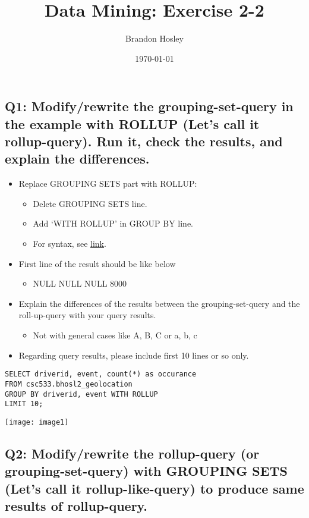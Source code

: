 \documentclass[]{article}
\title{Data Mining: Exercise 2-2}
\author{Brandon Hosley}
\date{\today}
\begin{document}
\maketitle


\subsection*{Q1: Modify/rewrite the grouping-set-query in the example with ROLLUP (Let’s call it rollup-query). Run it, check the results, and explain the differences.}

\begin{itemize}
	\item Replace GROUPING SETS part with ROLLUP:
	\begin{itemize}
		\item Delete GROUPING SETS line.
		\item Add ‘WITH ROLLUP’ in GROUP BY line.
		\item For syntax, see \href{https://cwiki.apache.org/confluence/display/Hive/Enhanced+Aggregation\%2C+Cube\%2C+Grouping+and+Rollup}{link}.
	\end{itemize}
	\item First line of the result should be like below
	\begin{itemize}
		\item NULL NULL NULL 8000
	\end{itemize}
	\item Explain the differences of the results between the grouping-set-query and the roll-up-query with your query results. 
	\begin{itemize}
		\item Not with general cases like A, B, C or a, b, c 
	\end{itemize}
	\item Regarding query results, please include first 10 lines or so only.
\end{itemize}

\begin{verbatim}
SELECT driverid, event, count(*) as occurance
FROM csc533.bhosl2_geolocation
GROUP BY driverid, event WITH ROLLUP
LIMIT 10;
\end{verbatim}

\texttt{[image: image1]}

\subsection*{Q2: Modify/rewrite the rollup-query (or grouping-set-query) with GROUPING SETS (Let’s call it rollup-like-query) to produce same results of rollup-query.}
\end{document}
